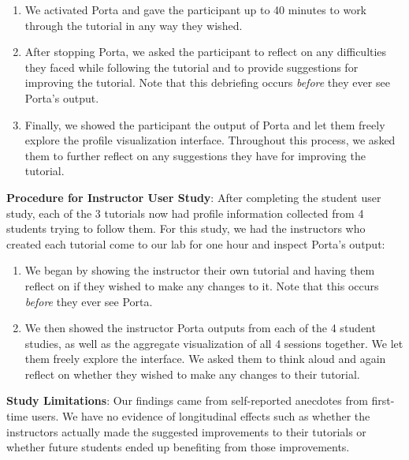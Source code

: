 \begin{enumerate}\itemsep0pt

\item We activated Porta and gave the participant up to 40 minutes to
work through the tutorial in any way they wished.

\item After stopping Porta, we asked the participant to reflect on any
difficulties they faced while following the tutorial and to provide
suggestions for improving the tutorial. Note that this debriefing occurs
\emph{before} they ever see Porta's output.

\item Finally, we showed the participant the output of Porta and let
them freely explore the profile visualization interface. Throughout this
process, we asked them to further reflect on any suggestions they have
for improving the tutorial.

\end{enumerate}


\textbf{Procedure for Instructor User Study}: After
completing the student user study, each of the 3 tutorials now had
profile information collected from 4 students trying to follow them.
%
For this study, we had the instructors who created each tutorial come to
our lab for one hour and inspect Porta's output:

\begin{enumerate}\itemsep0pt

\item We began by showing the instructor their own tutorial and having
them reflect on if they wished to make any changes to it. Note that this
occurs \emph{before} they ever see Porta.

\item We then showed the instructor Porta outputs from each of the 4
student studies, as well as the aggregate visualization of all 4
sessions together. We let them freely explore the interface. We asked
them to think aloud and again reflect on whether they wished to make any
changes to their tutorial.


\end{enumerate}


\textbf{Study Limitations}:
%
Our findings came from self-reported anecdotes from first-time users. We
have no evidence of longitudinal effects such as whether the instructors
actually made the suggested improvements to their tutorials or whether
future students ended up benefiting from those improvements.

